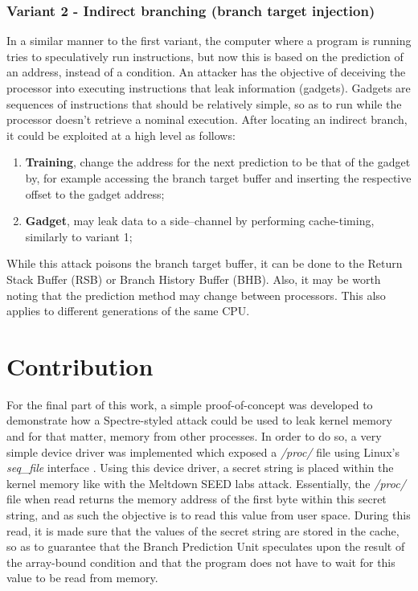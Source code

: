 \documentclass[conference]{IEEEtran}
\begin{document}
\subsubsection{Variant 2 - Indirect branching (branch target injection)}
In a similar manner to the first variant, the computer where a program is running tries to speculatively run instructions, but now this is based on the prediction of an address, instead of a condition. An attacker has the objective of deceiving the processor into executing instructions that leak information (gadgets). Gadgets are sequences of instructions that should be relatively simple, so as to run while the processor doesn't retrieve a nominal execution. After locating an indirect branch, it could be exploited at a high level as follows:
\begin{enumerate}
    \item \textbf{Training}, change the address for the next prediction to be that of the gadget by, for example accessing the branch target buffer and inserting the respective offset to the gadget address;
    \item \textbf{Gadget}, may leak data to a side--channel by performing cache-timing, similarly to variant 1;
\end{enumerate}

While this attack poisons the branch target buffer, it can be done to the Return Stack Buffer (RSB) or Branch History Buffer (BHB). Also, it may be worth noting that the prediction method may change between processors. This also applies to different generations of the same CPU.

\section{Contribution}

For the final part of this work, a simple proof-of-concept was developed to demonstrate how a Spectre-styled attack could be used to leak kernel memory and for that matter, memory from other processes. In order to do so, a very simple device driver was implemented which exposed a \textit{/proc/} file using Linux's \textit{seq\_file} interface \cite{seqFile}. Using this device driver, a secret string is placed within the kernel memory like with the Meltdown SEED labs attack. Essentially, the \textit{/proc/} file when read returns the memory address of the first byte within this secret string, and as such the objective is to read this value from user space. During this read, it is made sure that the values of the secret string are stored in the cache, so as to guarantee that the Branch Prediction Unit speculates upon the result of the array-bound condition and that the program does not have to wait for this value to be read from memory.  
\end{document}
